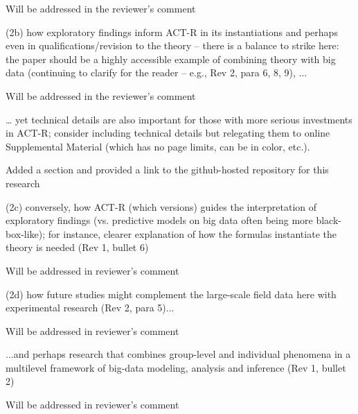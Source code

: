 \documentclass[answers,12pt]{exam}
\begin{document}
\begin{questions}
\begin{solution}
Will be addressed in the reviewer's comment
\end{solution}

\question (2b) how exploratory findings inform ACT-R in its instantiations and perhaps even in qualifications/revision to the theory -- there is a balance to strike here: the paper should be a highly accessible example of combining theory with big data (continuing to clarify for the reader -- e.g., Rev 2, para 6, 8, 9), ...

\begin{solution}
Will be addressed in the reviewer's comment
\end{solution}

\question … yet technical details are also important for those with more serious investments in ACT-R; consider including technical details but relegating them to online Supplemental Material (which has no page limits, can be in color, etc.).

\begin{solution}
Added a section and provided a link to the github-hosted repository for this research

\end{solution}

\question (2c) conversely, how ACT-R (which versions) guides the interpretation of exploratory findings (vs. predictive models on big data often being more black-box-like); for instance, clearer explanation of how the formulas instantiate the theory is needed (Rev 1, bullet 6)

\begin{solution}
Will be addressed in reviewer's comment
\end{solution}

\question (2d) how future studies might complement the large-scale field data here with experimental research (Rev 2, para 5)...

\begin{solution}
Will be addressed in reviewer's comment
\end{solution}

\question ...and perhaps research that combines group-level and individual phenomena in a multilevel framework of big-data modeling, analysis and inference (Rev 1, bullet 2)

\begin{solution}
Will be addressed in reviewer's comment
\end{solution}


\end{questions}
\end{document}
